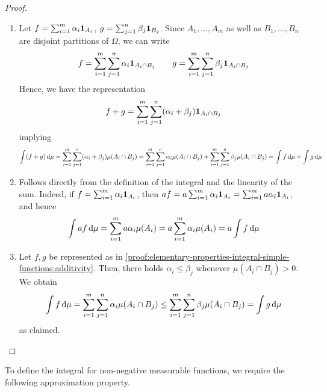 \begin{proof}
\begin{enumerate}[label=(\roman*)]
\item  \label{proof:elementary-properties-integral-simple-functions:additivity}
Let $f = \sum_{i=1}^m \alpha_i\mathbf{1}_{A_i}$, $g = \sum_{j=1}^n \beta_j\mathbf{1}_{B_j}$.
Since $A_1,\ldots,A_m$ as well as $B_1,\ldots,B_n$ are disjoint partitions of $\Omega$, we can write
\[
f
=
\sum_{i=1}^m\sum_{j=1}^n \alpha_i\mathbf{1}_{A_i\cap B_j}
\qquad
 g
=
\sum_{i=1}^m\sum_{j=1}^n \beta_j\mathbf{1}_{A_i\cap B_j}
\]
Hence, we have the representation
\[
f+g
=
\sum_{i=1}^m\sum_{j=1}^n (\alpha_i+\beta_j)\mathbf{1}_{A_i\cap B_j}
\]
implying
\begingroup
{\fontsize{6}{10}\selectfont
\[
\int (f+g)\,\mathrm{d}\mu
=
\sum_{i=1}^m\sum_{j=1}^n (\alpha_i+\beta_j)\mu(A_i \cap B_j) 
=
\sum_{i=1}^m\sum_{j=1}^n \alpha_i\mu(A_i \cap B_j)
+
\sum_{i=1}^m\sum_{j=1}^n \beta_j\mu(A_i \cap B_j) 
=
\int f\,\mathrm{d}\mu + \int g\,\mathrm{d}\mu
\]
}
\endgroup

\item Follows directly from the definition of the integral and the linearity of the sum.
Indeed, if $f = \sum_{i=1}^m \alpha_i\mathbf{1}_{A_i}$, then $af = a\sum_{i=1}^m \alpha_i\mathbf{1}_{A_i} = \sum_{i=1}^m a\alpha_i\mathbf{1}_{A_i}$, and hence
\[
\int af\,\dif\mu
= %
\sum_{i=1}^m a\alpha_i\mu(A_i)
=
a\sum_{i=1}^m \alpha_i\mu(A_i)
=
a\int f\,\dif\mu
\]

\item Let $f,g$ be represented as in \ref{proof:elementary-properties-integral-simple-functions:additivity}.
Then, there holds $\alpha_i \leq \beta_j$ whenever $\mu(A_i \cap B_j) > 0$.
We obtain
\[
\int f\,\mathrm{d}\mu
=
\sum_{i=1}^m\sum_{j=1}^n \alpha_i\mu(A_i \cap B_j)
\leq
\sum_{i=1}^m\sum_{j=1}^n \beta_j\mu(A_i \cap B_j)
=
\int g\,\mathrm{d}\mu
\]
as claimed.
\qedhere
\end{enumerate}
\end{proof}

To define the integral for non-negative measurable functions, we require the following approximation property.

